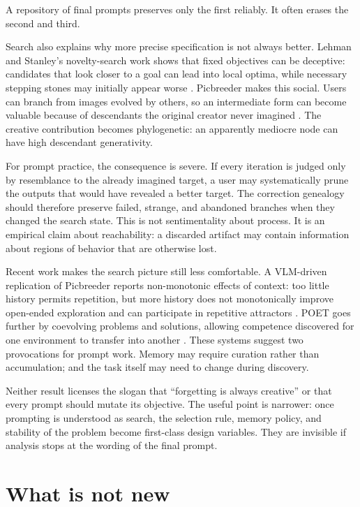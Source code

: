 \documentclass[11pt]{article}
\begin{document}
A repository of final prompts preserves only the first reliably. It often erases the second and third.

Search also explains why more precise specification is not always better. Lehman and Stanley's novelty-search work shows that fixed objectives can be deceptive: candidates that look closer to a goal can lead into local optima, while necessary stepping stones may initially appear worse \cite{lehman2011abandoning}. Picbreeder makes this social. Users can branch from images evolved by others, so an intermediate form can become valuable because of descendants the original creator never imagined \cite{secretan2008picbreeder}. The creative contribution becomes phylogenetic: an apparently mediocre node can have high descendant generativity.

For prompt practice, the consequence is severe. If every iteration is judged only by resemblance to the already imagined target, a user may systematically prune the outputs that would have revealed a better target. The correction genealogy should therefore preserve failed, strange, and abandoned branches when they changed the search state. This is not sentimentality about process. It is an empirical claim about reachability: a discarded artifact may contain information about regions of behavior that are otherwise lost.

Recent work makes the search picture still less comfortable. A VLM-driven replication of Picbreeder reports non-monotonic effects of context: too little history permits repetition, but more history does not monotonically improve open-ended exploration and can participate in repetitive attractors \cite{earle2026picbreeder}. POET goes further by coevolving problems and solutions, allowing competence discovered for one environment to transfer into another \cite{wang2019poet}. These systems suggest two provocations for prompt work. Memory may require curation rather than accumulation; and the task itself may need to change during discovery.

Neither result licenses the slogan that ``forgetting is always creative'' or that every prompt should mutate its objective. The useful point is narrower: once prompting is understood as search, the selection rule, memory policy, and stability of the problem become first-class design variables. They are invisible if analysis stops at the wording of the final prompt.

\section{What is not new}
\end{document}
